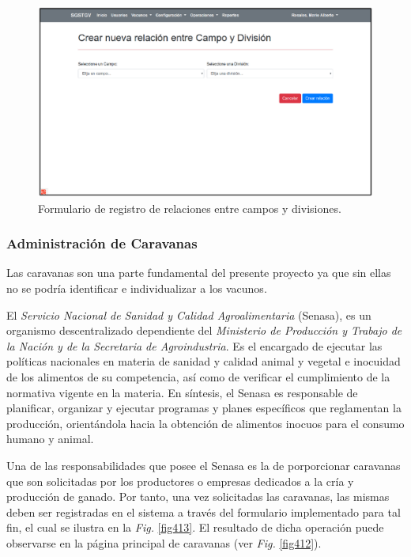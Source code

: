 \documentclass[11pt,oneside]{book}
\begin{document}
\begin{figure}[tbhp]
\centerline{\includegraphics[scale=0.87]{figs/capitulo_4_desarrollo/fig411.pdf}}
\caption{Formulario de registro de relaciones entre campos y divisiones.}
\label{fig411}
\end{figure}

\newpage
\subsubsection{Administración de Caravanas}
Las caravanas son una parte fundamental del presente proyecto ya que sin ellas no se podría identificar e individualizar a los vacunos.

El \textit{Servicio Nacional de Sanidad y Calidad Agroalimentaria} (Senasa), es un organismo descentralizado dependiente del \textit{Ministerio de Producción y Trabajo de la Nación y de la Secretaria de Agroindustria}. Es el encargado de ejecutar las políticas nacionales en materia de sanidad y calidad animal y vegetal e inocuidad de los alimentos de su competencia, así como de verificar el cumplimiento de la normativa vigente en la materia. En síntesis, el Senasa es responsable de planificar, organizar y ejecutar programas y planes específicos que reglamentan la producción, orientándola hacia la obtención de alimentos inocuos para el consumo humano y animal.

Una de las responsabilidades que posee el Senasa es la de porporcionar caravanas que son solicitadas por los productores o empresas dedicados a la cría y producción de ganado. Por tanto, una vez solicitadas las caravanas, las mismas deben ser registradas en el sistema a través del formulario implementado para tal fin, el cual se ilustra en la \textit{Fig.} \eqref{fig413}. El resultado de dicha operación puede observarse en la página principal de caravanas (ver \textit{Fig.} \eqref{fig412}).
\end{document}
